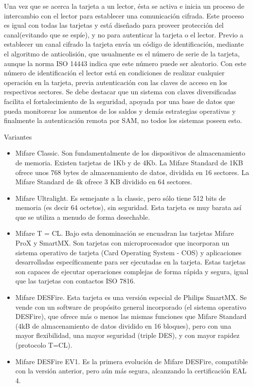 Una vez que se acerca la tarjeta a un lector, ésta se activa e inicia un proceso de intercambio con el lector para establecer una comunicación cifrada. Este proceso es igual con todas las tarjetas y está diseñado para proveer protección del canal(evitando que se espíe), y no para autenticar la tarjeta o el lector.
Previo a establecer un canal cifrado la tarjeta envía un código de identificación, mediante el algoritmo de anticolisión, que usualmente es el número de serie de la tarjeta, aunque la norma ISO 14443 indica que este número puede ser aleatorio. Con este número de identificación el lector está en condiciones de realizar cualquier operación en la tarjeta, previa autenticación con las claves de acceso en los respectivos sectores.
Se debe destacar que un sistema con claves diversificadas facilita el fortalecimiento de la seguridad, apoyada por una base de datos que pueda monitorear los aumentos de los saldos y demás estrategias operativas y finalmente la autenticación remota por SAM, no todos los sistemas poseen esto.

\bigskip
Variantes

\begin{itemize}
\item Mifare Classic. Son fundamentalmente de los dispositivos de almacenamiento de memoria. Existen tarjetas de 1Kb y de 4Kb. La Mifare Standard de 1KB ofrece unos 768 bytes de almacenamiento de datos, dividida en 16 sectores. La Mifare Standard de 4k ofrece 3 KB dividido en 64 sectores. 
\item Mifare Ultralight. Es semejante a la classic, pero sólo tiene 512 bits de memoria (es decir 64 octetos), sin seguridad. Esta tarjeta es muy barata así que se utiliza a menudo de forma desechable. 
\item Mifare T = CL. Bajo esta denominación se encuadran las tarjetas Mifare ProX y SmartMX. Son tarjetas con microprocesador que incorporan un sistema operativo de tarjeta (Card Operating System - COS) y aplicaciones desarrolladas específicamente para ser ejecutadas en la tarjeta. Estas tarjetas son capaces de ejecutar operaciones complejas de forma rápida y segura, igual que las tarjetas con contactos ISO 7816. 
\item Mifare DESFire. Esta tarjeta es una versión especial de Philips SmartMX. Se vende con un software de propósito general incorporado (el sistema operativo DESFire), que ofrece más o menos las mismas funciones que Mifare Standard (4kB de almacenamiento de datos dividido en 16 bloques), pero con una mayor flexibilidad, una mayor seguridad (triple DES), y con mayor rapidez (protocolo T=CL). 
\item Mifare DESFire EV1. Es la primera evolución de Mifare DESFire, compatible con la versión anterior, pero aún más segura, alcanzando la certificación EAL 4.
\end{itemize}